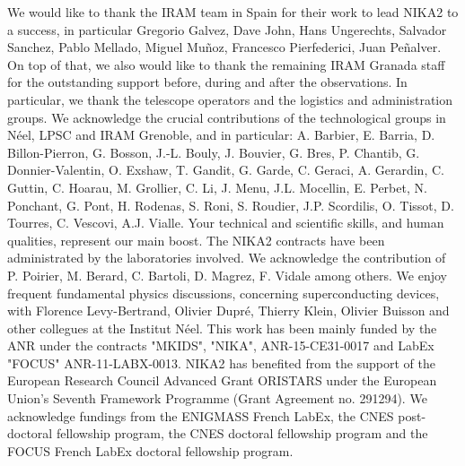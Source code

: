 \documentclass[]{aa} %
\begin{document}


\begin{acknowledgements}
We would like to thank the IRAM team in Spain for their work to lead NIKA2 to a success, in particular Gregorio Galvez, Dave John, Hans Ungerechts, Salvador Sanchez, Pablo Mellado, Miguel Mu\~noz, Francesco Pierfederici, Juan Pe\~nalver. On top of that, we also would like to thank the remaining IRAM Granada staff for the outstanding support before, during and after the observations. In particular, we thank the telescope operators and the logistics and administration groups. We acknowledge the crucial contributions of the technological groups in N\'eel, LPSC and IRAM Grenoble, and in particular: A. Barbier, E. Barria, D. Billon-Pierron, G. Bosson, J.-L. Bouly, J. Bouvier, G. Bres, P. Chantib, G. Donnier-Valentin,  O. Exshaw, T. Gandit, G. Garde, C. Geraci, A. Gerardin, C. Guttin, C. Hoarau, M. Grollier, C. Li, J. Menu, J.L. Mocellin, E. Perbet, N. Ponchant, G. Pont, H. Rodenas, S. Roni, S. Roudier, J.P. Scordilis, O. Tissot, D. Tourres, C. Vescovi, A.J. Vialle. Your technical and scientific skills, and human qualities, represent our main boost.  The NIKA2 contracts have been administrated by the laboratories involved. We acknowledge the contribution of P. Poirier, M. Berard, C. Bartoli, D. Magrez, F. Vidale among others. We enjoy frequent fundamental physics discussions, concerning superconducting devices, with Florence Levy-Bertrand, Olivier Dupr\'e, Thierry Klein, Olivier Buisson and other collegues at the Institut N\'eel. This work has been mainly funded by the ANR under the contracts "MKIDS", "NIKA", ANR-15-CE31-0017 and LabEx "FOCUS" ANR-11-LABX-0013. NIKA2 has benefited from the support of the European Research Council Advanced Grant ORISTARS under the European Union's Seventh Framework Programme (Grant Agreement no. 291294). We acknowledge fundings from the ENIGMASS French LabEx, the CNES post-doctoral fellowship program, the CNES doctoral fellowship program and the FOCUS French LabEx doctoral fellowship program.

\end{acknowledgements}


%
%


%
% 
\end{document}
